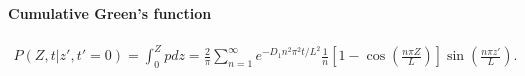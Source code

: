 \paragraph{Cumulative Green's function}
\begin{align}
  P(Z,t|z',t'=0) = \int_0^Z p dz =
  \frac{2}{\pi} \sum_{n=1}^{\infty} e^{-D_1n^2\pi^2 t/L^2}
      \frac{1}{n} \left[ 1 - \cos\left(\frac{n\pi Z}{L}\right) \right] \sin\left(\frac{n\pi z'}{L}\right).
\end{align}